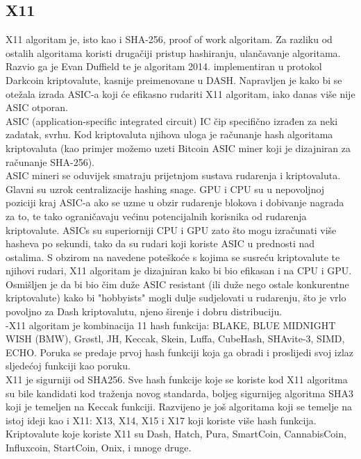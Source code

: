 \documentclass[12pt]{article}
\begin{document}
\pagebreak

\subsection{X11}
X11 algoritam je, isto kao i SHA-256, proof of work algoritam. Za razliku od ostalih algoritama koristi drugačiji pristup hashiranju, ulančavanje algoritama. Razvio ga je Evan Duffield te je algoritam 2014. implementiran u protokol Darkcoin kriptovalute, kasnije preimenovane u DASH.
Napravljen je kako bi se otežala izrada ASIC-a koji će efikasno rudariti X11 algoritam, iako danas više nije ASIC otporan.\\
ASIC (application-specific integrated circuit) IC čip specifično izrađen za neki zadatak, svrhu. Kod kriptovaluta njihova uloga je računanje hash algoritama kriptovaluta (kao primjer možemo uzeti Bitcoin ASIC miner koji je dizajniran za računanje SHA-256). \\
ASIC mineri se oduvijek smatraju prijetnjom sustava rudarenja i kriptovaluta. Glavni su uzrok centralizacije hashing snage. GPU i CPU su u nepovoljnoj poziciji kraj ASIC-a ako se uzme u obzir rudarenje blokova i dobivanje nagrada za to, te tako ograničavaju većinu potencijalnih korisnika od rudarenja kriptovalute. 
ASICs su superiorniji CPU i GPU zato što mogu izračunati više hasheva po sekundi, tako da su rudari koji koriste ASIC u prednosti nad ostalima.
S obzirom na navedene poteškoće s kojima se susreću kriptovalute te njihovi rudari, X11 algoritam je dizajniran kako bi bio efikasan i na CPU i GPU. Osmišljen je da bi bio čim duže ASIC resistant (ili duže nego ostale konkurentne kriptovalute) kako bi "hobbyists" mogli dulje sudjelovati u rudarenju, što je vrlo povoljno za Dash kriptovalutu, njeno širenje i dobru distribuciju. \\  
-X11 algoritam je kombinacija 11 hash funkcija: BLAKE, BLUE MIDNIGHT WISH (BMW), Grøstl, JH, Keccak, Skein, Luffa, CubeHash, SHAvite-3, SIMD, ECHO. Poruka se predaje prvoj hash funkciji koja ga obradi i proslijedi svoj izlaz sljedećoj funkciji kao poruku.\\
X11 je sigurniji od SHA256. Sve hash funkcije koje se koriste kod X11 algoritma su bile kandidati kod traženja novog standarda, boljeg sigurnijeg algoritma SHA3 koji je temeljen na Keccak funkciji.
Razvijeno je još algoritama koji se temelje na istoj ideji kao i X11: X13, X14, X15 i X17 koji koriste više hash funkcija.\\
Kriptovalute koje koriste X11 su Dash, Hatch, Pura, SmartCoin, CannabisCoin, Influxcoin, StartCoin, Onix, i mnoge druge.\cite{x11-description}
\end{document}
